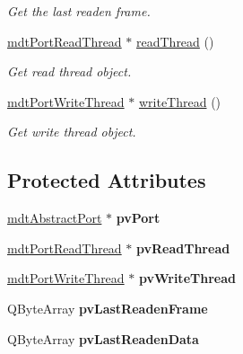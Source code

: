 \begin{DoxyCompactItemize}
\begin{DoxyCompactList}\small\item\em Get the last readen frame. \end{DoxyCompactList}\item 
\hyperlink{classmdt_port_read_thread}{mdtPortReadThread} $\ast$ \hyperlink{classmdt_port_manager_adb7669da204438b7b802c8efad422a71}{readThread} ()
\begin{DoxyCompactList}\small\item\em Get read thread object. \end{DoxyCompactList}\item 
\hyperlink{classmdt_port_write_thread}{mdtPortWriteThread} $\ast$ \hyperlink{classmdt_port_manager_aeac5a4abfd2a2f4e4ecb608ca9d38fcf}{writeThread} ()
\begin{DoxyCompactList}\small\item\em Get write thread object. \end{DoxyCompactList}\end{DoxyCompactItemize}
\subsection*{Protected Attributes}
\begin{DoxyCompactItemize}
\item 
\hypertarget{classmdt_port_manager_af856162aab4f1c5202c1dfb330fae538}{
\hyperlink{classmdt_abstract_port}{mdtAbstractPort} $\ast$ {\bfseries pvPort}}
\label{classmdt_port_manager_af856162aab4f1c5202c1dfb330fae538}

\item 
\hypertarget{classmdt_port_manager_a00a4396199165f0e4bc7dab802e924e6}{
\hyperlink{classmdt_port_read_thread}{mdtPortReadThread} $\ast$ {\bfseries pvReadThread}}
\label{classmdt_port_manager_a00a4396199165f0e4bc7dab802e924e6}

\item 
\hypertarget{classmdt_port_manager_a21da115c51338357c50243742be8f814}{
\hyperlink{classmdt_port_write_thread}{mdtPortWriteThread} $\ast$ {\bfseries pvWriteThread}}
\label{classmdt_port_manager_a21da115c51338357c50243742be8f814}

\item 
\hypertarget{classmdt_port_manager_adaa5de4e693944494c78fe9c7e8207d2}{
QByteArray {\bfseries pvLastReadenFrame}}
\label{classmdt_port_manager_adaa5de4e693944494c78fe9c7e8207d2}

\item 
\hypertarget{classmdt_port_manager_a27b171edec4e273e048593bbec7c37dc}{
QByteArray {\bfseries pvLastReadenData}}
\label{classmdt_port_manager_a27b171edec4e273e048593bbec7c37dc}

\end{DoxyCompactItemize}


